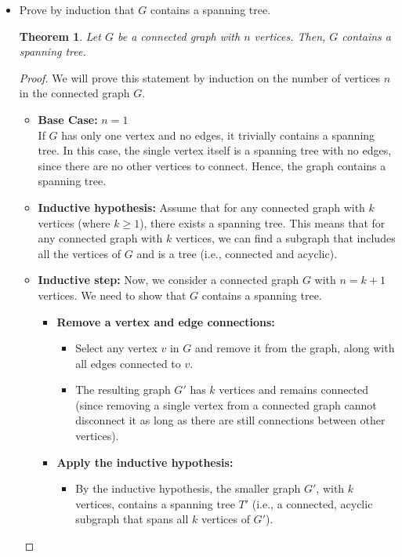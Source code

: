 \documentclass[12pt]{article}
\theoremstyle{plain}
\newtheorem*{theorem}{Theorem}
\begin{document}
\begin{itemize}
    \item[(a)] Prove by induction that $G$ contains a spanning tree.
    \begin{theorem}
        Let \( G \) be a connected graph with \( n \) vertices. Then, \( G \) contains a spanning tree.
    \end{theorem}
    \begin{proof} We will prove this statement by induction on the number of vertices \( n \) in the connected graph \( G \).
    \begin{itemize}
        \item[] \textbf{Base Case:} \( n = 1 \) \\
        If \( G \) has only one vertex and no edges, it trivially contains a spanning tree. In this case, the single vertex itself is a spanning tree with no edges, since there are no other vertices to connect. Hence, the graph contains a spanning tree.
        \item[] \textbf{Inductive hypothesis:} Assume that for any connected graph with \( k \) vertices (where \( k \geq 1 \)), there exists a spanning tree. This means that for any connected graph with \( k \) vertices, we can find a subgraph that includes all the vertices of \( G \) and is a tree (i.e., connected and acyclic).
        \item[] \textbf{Inductive step:} Now, we consider a connected graph \( G \) with \( n = k+1 \) vertices. We need to show that \( G \) contains a spanning tree. 
        \begin{itemize}
            \item[1.] \textbf{Remove a vertex and edge connections:}
            \begin{itemize}
                \item Select any vertex \( v \) in \( G \) and remove it from the graph, along with all edges connected to \( v \).
                \item The resulting graph \( G' \) has \( k \) vertices and remains connected (since removing a single vertex from a connected graph cannot disconnect it as long as there are still connections between other vertices).
            \end{itemize}
            \item[2.] \textbf{Apply the inductive hypothesis:}
            \begin{itemize}
                \item By the inductive hypothesis, the smaller graph \( G' \), with \( k \) vertices, contains a spanning tree \( T' \) (i.e., a connected, acyclic subgraph that spans all \( k \) vertices of \( G' \)).

\end{itemize}
\end{itemize}
\end{itemize}
\end{proof}
\end{itemize}
\end{document}
